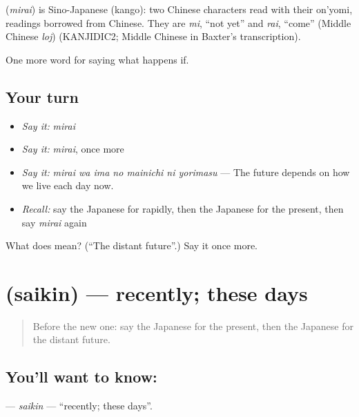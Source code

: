 \begin{cousinweb}
\textbf{} (\emph{mirai}) is Sino-Japanese (kango): two Chinese characters read with their on'yomi, readings borrowed from Chinese. They are \emph{mi}, \textquotedblleft{}not yet\textquotedblright{} and \emph{rai}, \textquotedblleft{}come\textquotedblright{} (Middle Chinese \emph{loj}) (KANJIDIC2; Middle Chinese in Baxter's transcription).
\end{cousinweb}

\begin{grammarlens}[title={What you've built}]
One more word for saying what happens if.
\end{grammarlens}

\subsection*{Your turn}
\begin{itemize}
\raggedright
  \item \emph{Say it:} \emph{mirai}
  \item \emph{Say it:} \emph{mirai}, once more
  \item \emph{Say it:} \emph{mirai wa ima no mainichi ni yorimasu} — The future depends on how we live each day now.
  \item \emph{Recall:} say the Japanese for rapidly, then the Japanese for the present, then say \emph{mirai} again
\end{itemize}

\begin{tcolorbox}[breakable,colback=teal!4,colframe=teal!35!black,title={Before you move on}]
What does  mean? (\textquotedblleft{}The distant future\textquotedblright{}.) Say it once more.
\end{tcolorbox}
\section[\texorpdfstring{\ja{さいきん} (saikin)}{さいきん (saikin)}]{ (saikin) — recently; these days}

\label{lesson:JA-C527-saikin}



\begin{quote}
Before the new one: say the Japanese for the present, then the Japanese for the distant future.
\end{quote}

\subsection*{You'll want to know: }
\textbf{} — \emph{saikin} — \textquotedblleft{}recently; these days\textquotedblright{}.

